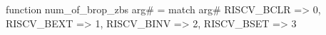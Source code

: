 function num_of_brop_zbs arg# = match arg# {
  RISCV_BCLR => 0,
  RISCV_BEXT => 1,
  RISCV_BINV => 2,
  RISCV_BSET => 3
}

